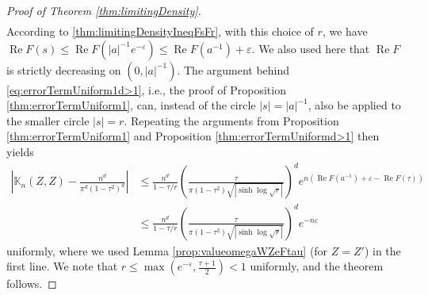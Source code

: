 \documentclass[%
 jmp,
cp,  %
 amsmath,amsthm,amssymb,%
 reprint,%
onecolumn]{revtex4-2}
\begin{document}
\begin{proof}[Proof of Theorem \ref{thm:limitingDensity}]
\begin{align*}
\end{align*}
According to \eqref{thm:limitingDensityIneqFsFr}, with this choice of $r$, we have 
$
\operatorname{Re} F(s) \leq  \operatorname{Re} F(|a|^{-1} e^{-\varepsilon})
\leq \operatorname{Re} F(a^{-1}) + \varepsilon$. We also used here that $\operatorname{Re} F$ is strictly decreasing on $(0,|a|^{-1})$. 
The argument behind \eqref{eq:errorTermUniform1d>1}, i.e., the proof of Proposition \ref{thm:errorTermUniform1}, can, instead of the circle $|s|=|a|^{-1}$, also be applied to the smaller circle $|s|=r$.
        Repeating the arguments from Proposition \ref{thm:errorTermUniform1} and Proposition \ref{thm:errorTermUniformd>1} then yields
        \begin{align*}
        \left|\mathbb K_n(Z,Z) - \frac{n^d}{\pi^d (1-\tau^2)^d}\right|
        &\leq 
        \frac{n^d}{1-\tau/r} \left(\frac{\tau}{\pi(1-\tau^2) \sqrt{|\sinh \log \sqrt r|}}\right)^d 
     e^{n (\operatorname{Re} F(a^{-1}) + \varepsilon - \operatorname{Re} F(\tau))}\\
     &\leq \frac{n^d}{1-\tau/r} \left(\frac{\tau}{\pi(1-\tau^2) \sqrt{|\sinh \log \sqrt r|}}\right)^d 
     e^{-n \varepsilon}
        \end{align*}
        uniformly, where we used Lemma \ref{prop:valueomegaWZeFtau} (for $Z=Z'$) in the first line. We note that $r\leq \max(e^{-\varepsilon}, \frac{\tau+1}{2}) < 1$ uniformly, and the theorem follows.  
    \end{proof}
\end{document}
